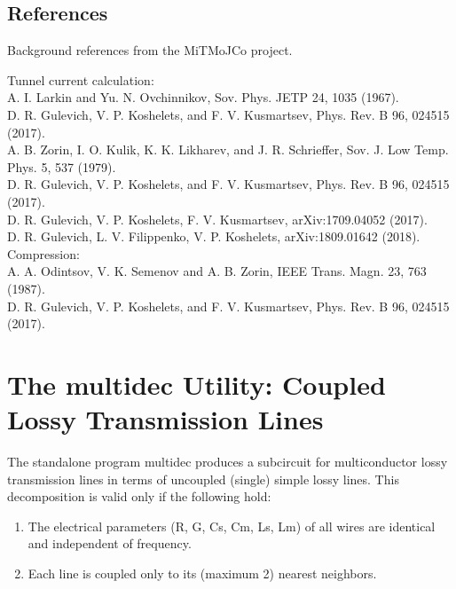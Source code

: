 \subsection{References}

Background references from the MiTMoJCo project.

Tunnel current calculation:\\
A. I. Larkin and Yu. N. Ovchinnikov, Sov. Phys. JETP 24, 1035 (1967).\\
D. R. Gulevich, V. P. Koshelets, and F. V. Kusmartsev, Phys. Rev. B 96,
 024515 (2017).\\
A. B. Zorin, I. O. Kulik, K. K. Likharev, and J. R. Schrieffer, Sov. J. 
 Low Temp. Phys. 5, 537 (1979).\\
D. R. Gulevich, V. P. Koshelets, and F. V. Kusmartsev, Phys.  Rev. B 96,
 024515 (2017).\\
D. R. Gulevich, V. P. Koshelets, F. V. Kusmartsev, arXiv:1709.04052 (2017).\\
D. R. Gulevich, L. V. Filippenko, V. P. Koshelets, arXiv:1809.01642 (2018).\\

Compression:\\
A. A. Odintsov, V. K. Semenov and A. B. Zorin, IEEE Trans. Magn. 23, 763
 (1987).\\
D. R. Gulevich, V. P. Koshelets, and F. V. Kusmartsev, Phys. Rev. B 96,
  024515 (2017).

\section{The {\vt multidec} Utility: Coupled Lossy Transmission Lines}


The standalone program {\vt multidec} produces a subcircuit for
multiconductor lossy transmission lines in terms of uncoupled (single)
simple lossy lines.  This decomposition is valid only if the following
hold:

\begin{enumerate}
\item{The electrical parameters (R, G, Cs, Cm, Ls, Lm) of all wires are
 identical and independent of frequency.}
\item{Each line is coupled only to its (maximum 2) nearest neighbors.}
\end{enumerate}

